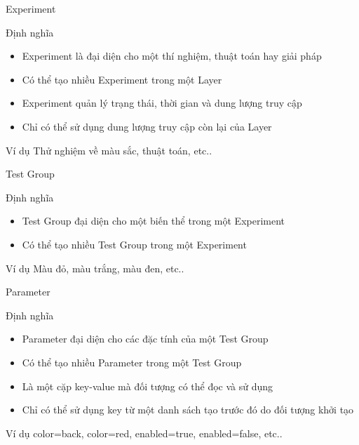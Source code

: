 \begin{frame}{Experiment}
	\begin{block}{Định nghĩa}
		\begin{itemize}
			\item Experiment là đại diện cho một thí nghiệm, thuật toán hay giải pháp
			\item Có thể tạo nhiều Experiment trong một Layer
			\item Experiment quản lý trạng thái, thời gian và dung lượng truy cập
			\item Chỉ có thể sử dụng dung lượng truy cập còn lại của Layer
		\end{itemize}
	\end{block}
	\begin{block}{Ví dụ}
		Thử nghiệm về màu sắc, thuật toán, etc..
	\end{block}
\end{frame}

\begin{frame}{Test Group}
	\begin{block}{Định nghĩa}
		\begin{itemize}
			\item Test Group đại diện cho một biến thể trong một Experiment
			\item Có thể tạo nhiều Test Group trong một Experiment
		\end{itemize}
	\end{block}
	\begin{block}{Ví dụ}
		Màu đỏ, màu trắng, màu đen, etc..
	\end{block}
\end{frame}

\begin{frame}{Parameter}
	\begin{block}{Định nghĩa}
		\begin{itemize}
			\item Parameter đại diện cho các đặc tính của một Test Group
			\item Có thể tạo nhiều Parameter trong một Test Group
			\item Là một cặp key-value mà đối tượng có thể đọc và sử dụng
			\item Chỉ có thể sử dụng key từ một danh sách tạo trước đó do đối tượng khởi tạo
		\end{itemize}
	\end{block}
	\begin{block}{Ví dụ}
		color=back, color=red, enabled=true, enabled=false, etc..
	\end{block}
\end{frame}
